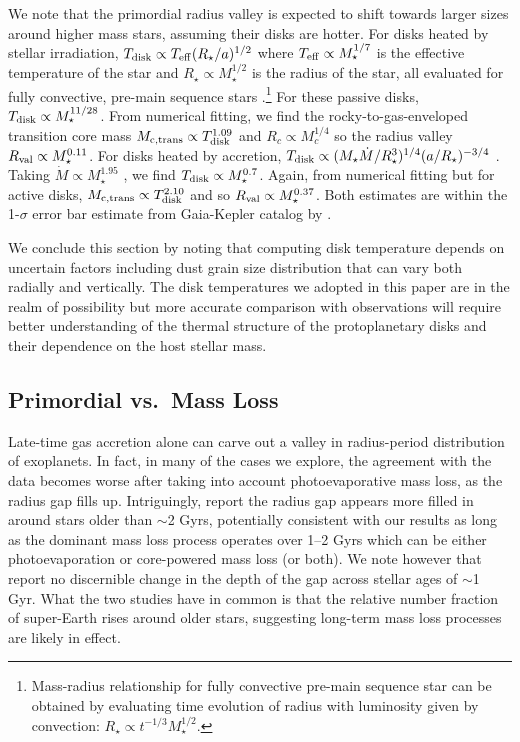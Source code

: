 \documentclass[twocolumn]{aastex63}
\begin{document}
We note that the primordial radius valley is expected to shift towards larger sizes around higher mass stars, assuming their disks are hotter. For disks heated by stellar irradiation, $T_{\rm disk} \propto T_{\rm eff} (R_\star/a)^{1/2}$ where $T_{\rm eff} \propto M_\star^{1/7}$ is the effective temperature of the star and $R_\star \propto M_\star^{1/2}$ is the radius of the star, all evaluated for fully convective, pre-main sequence stars \citep[e.g.,][]{Kippenhahn}.\footnote{Mass-radius relationship for fully convective pre-main sequence star can be obtained by evaluating time evolution of radius with luminosity given by convection: $R_\star \propto t^{-1/3}M_\star^{1/2}$.} For these passive disks, $T_{\rm disk} \propto M_\star^{11/28}$. From numerical fitting, we find the rocky-to-gas-enveloped transition core mass $M_{\rm c,trans} \propto T_{\rm disk}^{1.09}$ and $R_c \propto M_c^{1/4}$ so the radius valley $R_{\rm val} \propto M_\star^{0.11}$. For disks heated by accretion, $T_{\rm disk} \propto (M_\star \dot{M}/R_\star^3)^{1/4}(a/R_\star)^{-3/4}$ \citep{Clarke}. Taking $\dot{M} \propto M_\star^{1.95}$ \citep{Calvet04}, we find $T_{\rm disk} \propto M_\star^{0.7}$. Again, from numerical fitting but for active disks, $M_{\rm c,trans} \propto T_{\rm disk}^{2.10}$ and so $R_{\rm val} \propto M_\star^{0.37}$. Both estimates are within the 1-$\sigma$ error bar estimate from Gaia-Kepler catalog by \citet{Berger20}.

We conclude this section by noting that computing disk temperature depends on uncertain factors including dust grain size distribution that can vary both radially and vertically. The disk temperatures we adopted in this paper are in the realm of possibility but more accurate comparison with observations will require better understanding of the thermal structure of the protoplanetary disks and their dependence on the host stellar mass.

\subsection{Primordial vs.~Mass Loss}

Late-time gas accretion alone can carve out a valley in radius-period distribution of exoplanets. 
In fact, in many of the cases we explore, the agreement with the data becomes worse after taking into account photoevaporative mass loss, as the radius gap fills up. Intriguingly, \citet{David20} report the radius gap appears more filled in around stars older than $\sim$2 Gyrs, potentially consistent with our results as long as the dominant mass loss process operates over 1--2 Gyrs which can be either photoevaporation \citep[e.g.,][]{King20} or core-powered mass loss \citep[e.g.,][]{Ginzburg18} (or both). We note however that \citet{Berger20} report no discernible change in the depth of the gap across stellar ages of $\sim$1 Gyr. What the two studies have in common is that the relative number fraction of super-Earth rises around older stars, suggesting long-term mass loss processes are likely in effect.
\end{document}
